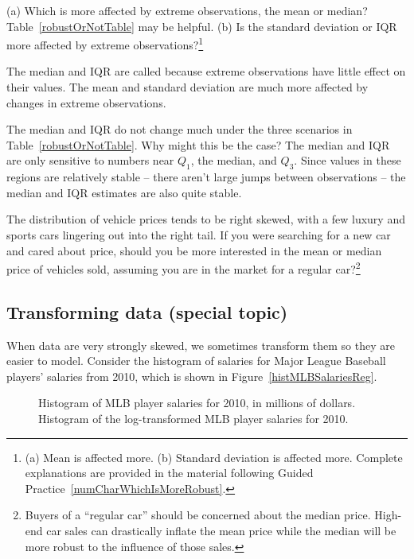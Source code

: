 \begin{exercise} \label{numCharWhichIsMoreRobust}
(a) Which is more affected by extreme observations, the mean or median? Table~\ref{robustOrNotTable} may be helpful. (b) Is the standard deviation or IQR more affected by extreme observations?\footnote{(a) Mean is affected more. (b) Standard deviation is affected more. Complete explanations are provided in the material following Guided Practice~\ref{numCharWhichIsMoreRobust}.}
\end{exercise}

The median and IQR are called  because extreme observations have little effect on their values. The mean and standard deviation are much more affected by changes in extreme observations.

\begin{example}{The median and IQR do not change much under the three scenarios in Table~\ref{robustOrNotTable}. Why might this be the case?}
The median and IQR are only sensitive to numbers near $Q_1$, the median, and $Q_3$. Since values in these regions are relatively stable -- there aren't large jumps between observations -- the median and IQR estimates are also quite stable.
\end{example}

\begin{exercise}
The distribution of vehicle prices tends to be right skewed, with a few luxury and sports cars lingering out into the right tail. If you were searching for a new car and cared about price, should you be more interested in the mean or median price of vehicles sold, assuming you are in the market for a regular car?\footnote{Buyers of a ``regular car'' should be concerned about the median price. High-end car sales can drastically inflate the mean price while the median will be more robust to the influence of those sales.}
\end{exercise}

\subsection{Transforming data (special topic)}
\label{transformingDataSubsection}

When data are very strongly skewed, we sometimes transform them so they are easier to model. Consider the histogram of salaries for Major League Baseball players' salaries from 2010, which is shown in Figure~\ref{histMLBSalariesReg}.

\begin{figure}[ht]
\centering
{}
\caption{ Histogram of MLB player salaries for 2010, in millions of dollars.  Histogram of the log-transformed MLB player salaries for 2010.}
\label{histMLBSalaries}
\end{figure}

